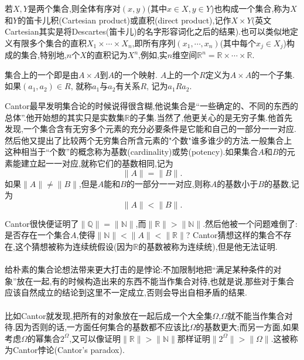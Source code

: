 若$X,Y$是两个集合,则全体有序对$(x,y)$(其中$x\in X,y\in Y$)也构成一个集合,称为$X$和$Y$的笛卡儿积(Cartesian product)或直积(direct product),记作$X\times Y$(英文Cartesian其实是将Descartes(笛卡儿)的名字形容词化之后的结果).也可以类似地定义有限多个集合的直积$X_1\times \cdots \times X_n$,即所有序列$(x_1,\cdots,x_n)$(其中每个$x_j\in X_j$)构成的集合,特别地,$n$个$X$的直积记为$X^n$,例如,实$n$维空间$\mathbb{R}^n = \mathbb{R}\times\cdots\times\mathbb{R}$.

集合上的一个即是由$A\times A$到$A$的一个映射. $A$上的一个$R$定义为$A\times A$的一个子集. 如果$(a_1,a_2)\in R$, 就称$a_1$与$a_2$有关系$R$, 记为$a_1Ra_2$.

\begin{definition}[]
	
\end{definition}


Cantor最早发明集合论的时候说得很含糊,他说集合是“一些确定的、不同的东西的总体”.他开始想的其实只是实数集$\mathbb{R}$的子集.当然了,他更关心的是无穷子集.他首先发现,一个集合含有无穷多个元素的充分必要条件是它能和自己的一部分一一对应.然后他又提出了比较两个无穷集合所含元素的"个数"谁多谁少的方法.一般集合上这种相当于“个数”的概念称为基数(cardinality)或势(potency).如果集合$A$和$B$的元素能建立起一一对应,就称它们的基数相同,记为\begin{equation}
\|A\| = \|B\|.
\end{equation}
如果$\|A\|\neq\|B\|$,但是$A$能和$B$的一部分一一对应,则称$A$的基数小于$B$的基数,记为\begin{equation}
\|A\| < \|B\|.
\end{equation}



Cantor很快便证明了$\|\mathbb{Q}\| = \|\mathbb{N}\|$,而$\|\mathbb{R}\| > \|\mathbb{N}\|$.然后他被一个问题难倒了:是否存在一个集合$A$,使得$\|\mathbb{N}\|<\|A\|<\|\mathbb{R}\|$? Cantor猜想这样的集合不存在,这个猜想被称为连续统假设(因为$\mathbb{R}$的基数被称为连续统),但是他无法证明.
\\ \hspace*{\fill} \\%
给朴素的集合论想法带来更大打击的是悖论:不加限制地把“满足某种条件的对象”放在一起,有的时候构造出来的东西不能当作集合对待,也就是说,那些对于集合应该自然成立的结论到这里不一定成立,否则会导出自相矛盾的结果.
\\ \hspace*{\fill} \\%
比如Cantor就发现,把所有的对象放在一起后成一个大全集$\Omega$,$\Omega$就不能当作集合对待.因为否则的话,一方面任何集合的基数都不应该比$\Omega$的基数更大;而另一方面,如果考虑$\Omega$的幂集合$2^\Omega$,又可以像证明$\|\mathbb{R}\| > \|\mathbb{N}\|$那样证明$\|2^\Omega\|>\|\Omega\|$.这被称为Cantor悖论(Cantor's paradox).



